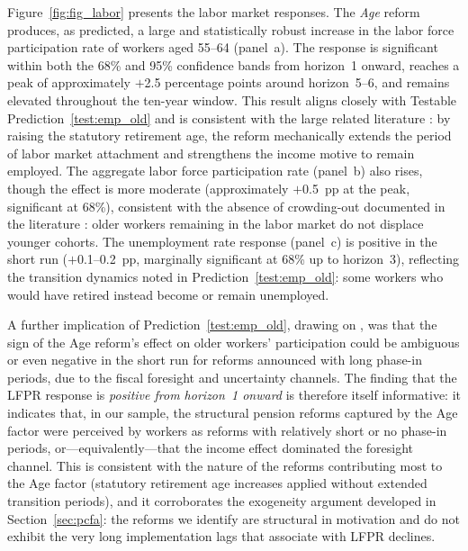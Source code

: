\documentclass[11pt,english,a4paper, twoside, authoryear]{article}
\begin{document}
Figure~\ref{fig:fig_labor} presents the labor market responses. The \textit{Age} reform produces, as predicted, a large and statistically robust increase in the labor force participation rate of workers aged 55--64 (panel~a). The response is significant within both the 68\% and 95\% confidence bands from horizon~1 onward, reaches a peak of approximately $+$2.5 percentage points around horizon~5--6, and remains elevated throughout the ten-year window. This result aligns closely with Testable Prediction~\ref{test:emp_old} and is consistent with the large related literature \citep{StaubliZweimuller2013,GruberWise1999}: by raising the statutory retirement age, the reform mechanically extends the period of labor market attachment and strengthens the income motive to remain employed. The aggregate labor force participation rate (panel~b) also rises, though the effect is more moderate (approximately $+$0.5~pp at the peak, significant at 68\%), consistent with the absence of crowding-out documented in the literature \citep{MunnellWu2012,Dai2022}: older workers remaining in the labor market do not displace younger cohorts. The unemployment rate response (panel~c) is positive in the short run ($+$0.1--0.2~pp, marginally significant at 68\% up to horizon~3), reflecting the transition dynamics noted in Prediction~\ref{test:emp_old}: some workers who would have retired instead become or remain unemployed. 

A further implication of Prediction~\ref{test:emp_old}, drawing on \citet{BiZubairy2023}, was that the sign of the Age reform's effect on older workers' participation could be ambiguous or even negative in the short run for reforms announced with long phase-in periods, due to the fiscal foresight and uncertainty channels. The finding that the LFPR response is \emph{positive from horizon~1 onward} is therefore itself informative: it indicates that, in our sample, the structural pension reforms captured by the Age factor were perceived by workers as reforms with relatively short or no phase-in periods, or---equivalently---that the income effect dominated the foresight channel. This is consistent with the nature of the reforms contributing most to the Age factor (statutory retirement age increases applied without extended transition periods), and it corroborates the exogeneity argument developed in Section~\ref{sec:pcfa}: the reforms we identify are structural in motivation and do not exhibit the very long implementation lags that \citet{BiZubairy2023} associate with LFPR declines.
\end{document}
